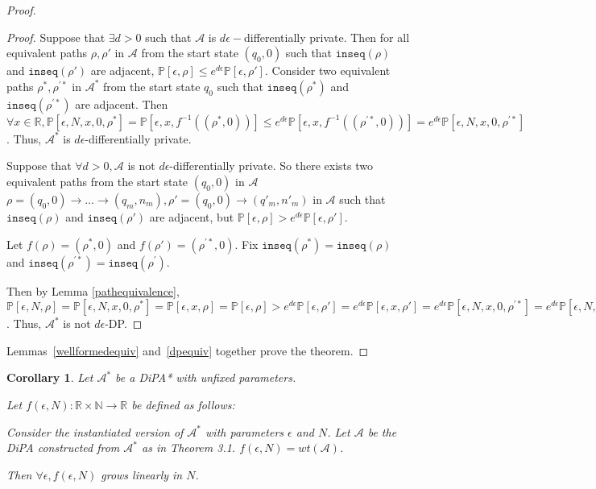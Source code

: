 \documentclass[12pt]{article}
\newcommand{\NN}{\mathbb{N}}
\newcommand{\RR}{\mathbb{R}}
\newcommand{\PP}{\mathbb{P}}
\newtheorem{cor}[thm]{Corollary}
\theoremstyle{definition}
\begin{document}
\begin{proof}
\begin{proof}
	Suppose that $\exists d > 0$ such that $\mathcal{A}$ is $d\epsilon-$differentially private. Then for all equivalent paths $\rho, \rho'$ in $\mathcal{A}$ from the start state $(q_0, 0)$ such that $\texttt{inseq}(\rho)$ and $\texttt{inseq}(\rho')$ are adjacent, $\PP[\epsilon, \rho] \leq e^{d\epsilon} \PP[\epsilon, \rho']$.
	Consider two equivalent paths $\rho^*, \rho^{\prime *}$ in $\mathcal{A}^*$ from the start state $q_0$ such that $\texttt{inseq}(\rho^*)$ and $\texttt{inseq}(\rho^{\prime *})$ are adjacent. Then $\forall x\in \RR, \PP[\epsilon, N, x, 0, \rho^*] = \PP[\epsilon, x, f^{-1}((\rho^*, 0))] \leq e^{d\epsilon}\PP[\epsilon, x, f^{-1}((\rho^{\prime *}, 0))] = e^{d\epsilon}\PP[\epsilon, N, x, 0, \rho^{\prime *}]$. Thus, $\mathcal{A}^*$ is $d\epsilon$-differentially private.

	Suppose that $\forall d>0, \mathcal{A}$ is not $d\epsilon$-differentially private. So there exists two equivalent paths from the start state $(q_0, 0)$ in $\mathcal{A}$ $\rho = (q_0, 0)\to\ldots\to (q_m, n_m), \rho' = (q_0, 0) \to (q'_m, n'_m)$ in $\mathcal{A}$ such that $\texttt{inseq}(\rho)$ and $\texttt{inseq}(\rho')$ are adjacent, but $\PP[\epsilon, \rho] > e^{d\epsilon}\PP[\epsilon, \rho']$. 
	
	Let $f(\rho) = (\rho^*, 0)$ and $f(\rho') = (\rho^{\prime *}, 0)$. Fix $\texttt{inseq}(\rho^*) = \texttt{inseq}(\rho)$ and $\texttt{inseq}(\rho^{\prime *})=\texttt{inseq}(\rho^{\prime})$.

	Then by Lemma \ref{pathequivalence}, $\PP[\epsilon, N, \rho]=\PP[\epsilon, N, x, 0, \rho^*] = \PP[\epsilon, x, \rho] = \PP[\epsilon, \rho] > e^{d\epsilon}\PP[\epsilon, \rho'] = e^{d\epsilon}\PP[\epsilon, x, \rho'] = e^{d\epsilon}\PP[\epsilon, N, x, 0, \rho^{\prime *}]= e^{d\epsilon}\PP[\epsilon, N, \rho^{\prime *}]$. Thus, $\mathcal{A}^*$ is not $d\epsilon$-DP.
\end{proof}

Lemmas~\ref{wellformedequiv} and~\ref{dpequiv} together prove the theorem. 
\end{proof}

\begin{cor}	

	Let $\mathcal{A}^*$ be a DiPA* with unfixed parameters.

	Let $f(\epsilon, N):\RR\times \NN \to \RR$ be defined as follows:

	Consider the instantiated version of $\mathcal{A}^*$ with parameters $\epsilon$ and $N$. Let $\mathcal{A}$ be the DiPA constructed from $\mathcal{A}^*$ as in Theorem 3.1. $f(\epsilon, N) = wt(\mathcal{A})$.
	
	Then $\forall \epsilon, f(\epsilon, N)$ grows linearly in $N$.
\end{cor}
\end{document}
